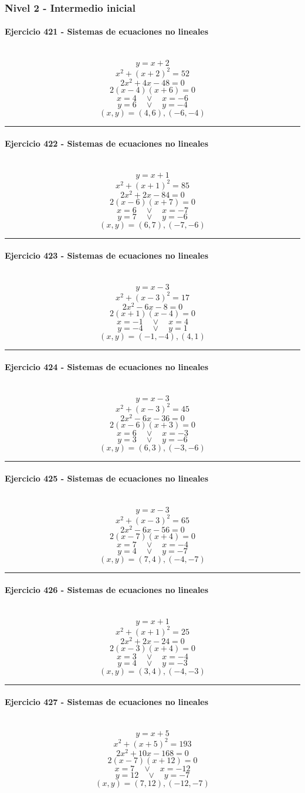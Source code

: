\documentclass[10pt,a4paper]{article}
\newcommand{\res}[1]{\paragraph{#1}\mbox{}\\[-1.2em]}
\begin{document}
\subsubsection*{Nivel 2 - Intermedio inicial}
\res{Ejercicio 421 - Sistemas de ecuaciones no lineales}
\[ y=x+2 \]
\[ x^2+(x+2)^2=52 \]
\[ 2 x^{2} + 4 x - 48=0 \]
\[ 2(x-4)(x+6)=0 \]
\[ x=4\quad \vee \quad x=-6 \]
\[ y=6\quad \vee \quad y=-4 \]
\[ \boxed{(x,y)=(4,6),(-6,-4)} \]
\vspace{1mm}\hrule\vspace{2mm}
\res{Ejercicio 422 - Sistemas de ecuaciones no lineales}
\[ y=x+1 \]
\[ x^2+(x+1)^2=85 \]
\[ 2 x^{2} + 2 x - 84=0 \]
\[ 2(x-6)(x+7)=0 \]
\[ x=6\quad \vee \quad x=-7 \]
\[ y=7\quad \vee \quad y=-6 \]
\[ \boxed{(x,y)=(6,7),(-7,-6)} \]
\vspace{1mm}\hrule\vspace{2mm}
\res{Ejercicio 423 - Sistemas de ecuaciones no lineales}
\[ y=x-3 \]
\[ x^2+(x-3)^2=17 \]
\[ 2 x^{2} - 6 x - 8=0 \]
\[ 2(x+1)(x-4)=0 \]
\[ x=-1\quad \vee \quad x=4 \]
\[ y=-4\quad \vee \quad y=1 \]
\[ \boxed{(x,y)=(-1,-4),(4,1)} \]
\vspace{1mm}\hrule\vspace{2mm}
\res{Ejercicio 424 - Sistemas de ecuaciones no lineales}
\[ y=x-3 \]
\[ x^2+(x-3)^2=45 \]
\[ 2 x^{2} - 6 x - 36=0 \]
\[ 2(x-6)(x+3)=0 \]
\[ x=6\quad \vee \quad x=-3 \]
\[ y=3\quad \vee \quad y=-6 \]
\[ \boxed{(x,y)=(6,3),(-3,-6)} \]
\vspace{1mm}\hrule\vspace{2mm}
\res{Ejercicio 425 - Sistemas de ecuaciones no lineales}
\[ y=x-3 \]
\[ x^2+(x-3)^2=65 \]
\[ 2 x^{2} - 6 x - 56=0 \]
\[ 2(x-7)(x+4)=0 \]
\[ x=7\quad \vee \quad x=-4 \]
\[ y=4\quad \vee \quad y=-7 \]
\[ \boxed{(x,y)=(7,4),(-4,-7)} \]
\vspace{1mm}\hrule\vspace{2mm}
\res{Ejercicio 426 - Sistemas de ecuaciones no lineales}
\[ y=x+1 \]
\[ x^2+(x+1)^2=25 \]
\[ 2 x^{2} + 2 x - 24=0 \]
\[ 2(x-3)(x+4)=0 \]
\[ x=3\quad \vee \quad x=-4 \]
\[ y=4\quad \vee \quad y=-3 \]
\[ \boxed{(x,y)=(3,4),(-4,-3)} \]
\vspace{1mm}\hrule\vspace{2mm}
\res{Ejercicio 427 - Sistemas de ecuaciones no lineales}
\[ y=x+5 \]
\[ x^2+(x+5)^2=193 \]
\[ 2 x^{2} + 10 x - 168=0 \]
\[ 2(x-7)(x+12)=0 \]
\[ x=7\quad \vee \quad x=-12 \]
\[ y=12\quad \vee \quad y=-7 \]
\[ \boxed{(x,y)=(7,12),(-12,-7)} \]
\end{document}
